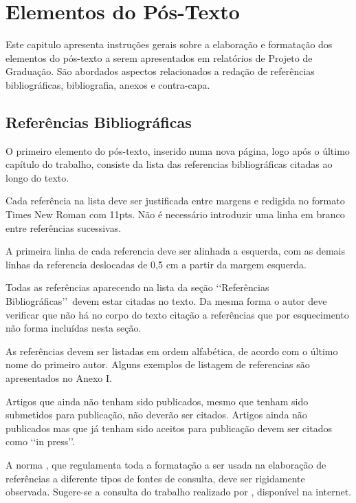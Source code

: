 \chapter[Elementos do Pós-Texto]{Elementos do Pós-Texto}

Este capitulo apresenta instruções gerais sobre a elaboração e formatação dos 
elementos do pós-texto a serem apresentados em relatórios de Projeto de 
Graduação. São abordados aspectos relacionados a redação de referências 
bibliográficas, bibliografia, anexos e contra-capa.

\section{Referências Bibliográficas}


O primeiro elemento do pós-texto, inserido numa nova página, logo após o último 
capítulo do trabalho, consiste da lista das referencias bibliográficas citadas 
ao longo do texto.

Cada referência na lista deve ser justificada entre margens e redigida no 
formato Times New Roman com 11pts. Não é necessário introduzir uma linha em 
branco entre referências sucessivas.

A primeira linha de cada referencia deve ser alinhada a esquerda, com as demais 
linhas da referencia deslocadas de 0,5 cm a partir da margem esquerda. 

Todas as referências aparecendo na lista da seção \lq\lq Referências 
Bibliográficas\rq\rq\ devem estar citadas no texto. Da mesma forma o autor deve 
verificar que não há no corpo do texto citação a referências que por 
esquecimento não forma incluídas nesta seção.

As referências devem ser listadas em ordem alfabética, de acordo com o último 
nome do primeiro autor. Alguns exemplos de listagem de referencias são 
apresentados no Anexo I.

Artigos que ainda não tenham sido publicados, mesmo que tenham sido submetidos 
para publicação, não deverão ser citados. Artigos ainda não publicados mas que 
já tenham sido aceitos para publicação devem ser citados como \lq\lq in 
press\rq\rq.

A norma \cite{NBR6034:2000}, que regulamenta toda a formatação a ser usada na 
elaboração de referências a diferente tipos de fontes de consulta, deve ser 
rigidamente observada. Sugere-se a consulta do trabalho realizado por 
\cite{arruda2007}, disponível na internet.

